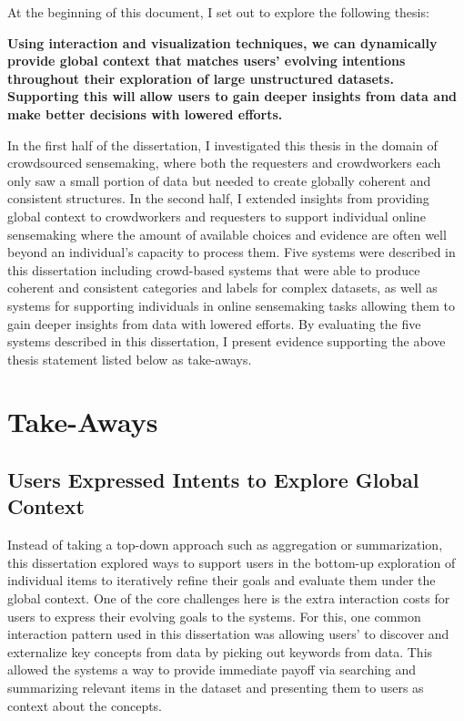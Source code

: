 At the beginning of this document, I set out to explore the following thesis:

\textbf{Using interaction and visualization techniques, we can dynamically provide global context that matches users’ evolving intentions throughout their exploration of large unstructured datasets. Supporting this will allow users to gain deeper insights from data and make better decisions with lowered efforts.}

In the first half of the dissertation, I investigated this thesis in the domain of crowdsourced sensemaking, where both the requesters and crowdworkers each only saw a small portion of data but needed to create globally coherent and consistent structures. In the second half,  I extended insights from providing global context to crowdworkers and requesters to support individual online sensemaking where the amount of available choices and evidence are often well beyond an individual’s capacity to process them. Five systems were described in this dissertation including crowd-based systems that were able to produce coherent and consistent categories and labels for complex datasets, as well as systems for supporting individuals in online sensemaking tasks allowing them to gain deeper insights from data with lowered efforts. By evaluating the five systems described in this dissertation, I present evidence supporting the above thesis statement listed below as take-aways. 

\section{Take-Aways}

\subsection{Users Expressed Intents to Explore Global Context}

Instead of taking a top-down approach such as aggregation or summarization, this dissertation explored ways to support users in the bottom-up exploration of individual items to iteratively refine their goals and evaluate them under the global context. One of the core challenges here is the extra interaction costs for users to express their evolving goals to the systems. For this, one common interaction pattern used in this dissertation was allowing users' to discover and externalize key concepts from data by picking out keywords from data. This allowed the systems a way to provide immediate payoff via searching and summarizing relevant items in the dataset and presenting them to users as context about the concepts.

